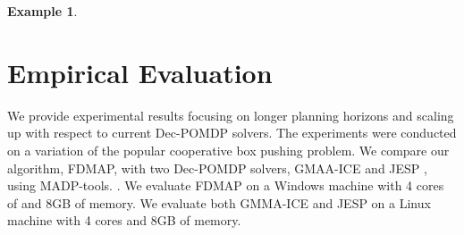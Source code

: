 \documentclass[letterpaper]{article} %
\theoremstyle{definition}
\newtheorem{example}{Example}
\newcommand{\commentout}[1]{}
\begin{document}
{\begin{example}
\end{example}
}

\commentout{
\begin{algorithm}
\caption{Alignment Iteration}
\begin{algorithmic}[tbph]
\State Input: PolicyGraphs $G_1, ..., G_M$
\For{$G_i,  i\in\{1, ..., M\}$}
	\State {$\mathit{NoopsReqs} \gets \mathit{VertexToIntMapping}$}
      \State {$\mathit{CurrBFS} \gets \Call{BFS}{G_i}$}
      \While {$\mathit{CurrBFS.queue}$ is not empty}
	\State {$v \gets \mathit{CurrBFS.queue.pop}$}
	\State {$a \gets v.action$}
	\If {$a$ is public action}
	\State {$\mathit{identifier} \gets \Call{GetIdentifier}{v}$}
	\State {$\mathit{MaxNoop} \gets 0$}
	\For {$G_j,  j\in\{1, ..., M\}\setminus\{i\}$}
	\State {$\mathit{CurrNoop} \gets \Call{NoopReq}{G_j, \mathit{identifier}}$}
	\State {$\mathit{MaxNoop} \gets max(\mathit{MaxNoop}, \mathit{CurrNoop})$}
	\EndFor
	\State {$\mathit{NoopsReqs}[v] \gets \mathit{MaxNoop} - \mathit{CompensationTerm}$}
	\EndIf
	\EndWhile
	\State {$G_i' \gets \Call{AddNoops}{G_i, \mathit{NoopsReqs}}$}
\EndFor
\State {return $G_1', ..., G_M'$}
\end{algorithmic}
\end{algorithm}
}

\section{Empirical Evaluation}

We provide experimental results focusing on longer planning horizons and scaling up with respect to current Dec-POMDP solvers.
The experiments were conducted on a variation of the popular cooperative box pushing problem.
We compare our algorithm, FDMAP, with two Dec-POMDP solvers, GMAA-ICE \cite{GMAAICE} and JESP \cite{JESP}, using MADP-tools. \cite{MADP}.
We evaluate FDMAP on a Windows machine with 4 cores of and 8GB of memory. We evaluate both GMMA-ICE and JESP on a Linux machine with 4 cores and 8GB of memory.
\end{document}
